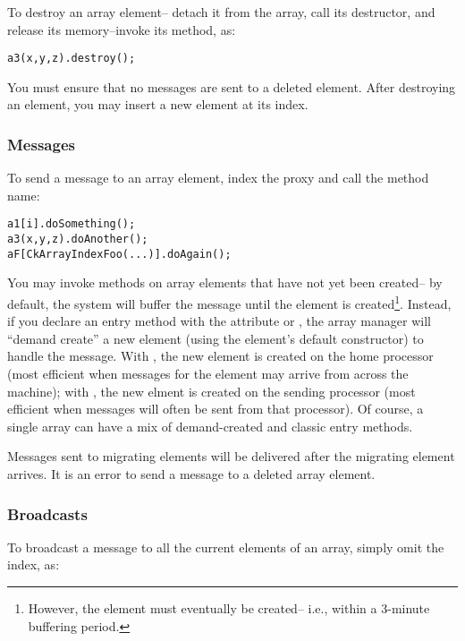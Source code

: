 To destroy an array element-- detach it from the array,
call its destructor, and release its memory--invoke its 
 method, as:

\begin{alltt}
a3(x,y,z).destroy();
\end{alltt}

You must ensure that no messages are sent to a deleted element. 
After destroying an element, you may insert a new element at
its index.


\subsubsection{Messages}

To send a  message to an array element, index the proxy 
and call the method name:

\begin{alltt}
a1[i].doSomething();
a3(x,y,z).doAnother();
aF[CkArrayIndexFoo(...)].doAgain();
\end{alltt}

You may invoke methods on array elements that have not yet
been created-- by default, the system will buffer the message until the
element is created\footnote{However, the element must eventually be 
created-- i.e., within a 3-minute buffering period.}.
Instead, if you declare an entry method with the attribute 
 
\kw{[createhere]} or \kw{[createhome]}, the array manager will 
``demand create'' a new element (using the element's default constructor)
to handle the message.  With \kw{[createhome]}, the new element
is created on the home processor (most efficient when messages for
the element may arrive from across the machine); with \kw{[createhere]},
the new elment is created on the sending processor (most efficient
when messages will often be sent from that processor).
Of course, a single array can have a mix of demand-created and
classic entry methods.


Messages sent to migrating elements will be delivered after
the migrating element arrives.  It is an error to send 
a message to a deleted array element.


\subsubsection{Broadcasts}
To  broadcast a message to all the current elements of an array, 
simply omit the index, as:

